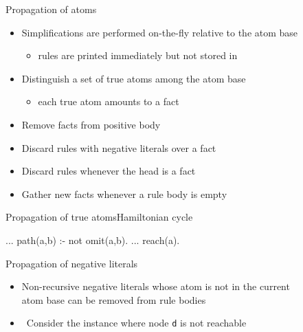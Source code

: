 \begin{frame}{Propagation of atoms}
  \bigskip
  \begin{itemize}
  \item Simplifications are performed \alert{on-the-fly} relative to the atom base
    \begin{itemize}\normalsize
    \item [\itarrow] rules are printed immediately but not stored in \gringo
    \end{itemize}
    \medskip
  \item<2-> Distinguish a set of \alert{true atoms} among the atom base
    \begin{itemize}\normalsize
    \item [\itarrow] each true atom amounts to a fact
    \end{itemize}
    \medskip
  \item<3-> Remove facts from positive body
    \smallskip
  \item<3-> Discard rules with negative literals over a fact
    \smallskip
  \item<3-> Discard rules whenever the head is a fact
    \smallskip
  \item<3-> Gather new facts whenever a rule body is empty
  \end{itemize}
\end{frame}
\begin{frame}[fragile]{Propagation of true atoms}{Hamiltonian cycle}
  \bigskip
  \begin{SemiVerbatim}{.9}
...
path(a,b) :- not omit(a,b).
...
reach(a). {}
\end{SemiVerbatim}
\end{frame}
\begin{frame}{Propagation of negative literals}
  \bigskip
  \begin{itemize}
  \item \alert{Non-recursive negative literals} whose atom is not in the current
    \\ atom base can be removed from rule bodies
    \medskip
  \item {} \ Consider the instance where node \texttt{d} is not reachable
  \end{itemize}
  \bigskip
  \begin{center}
    \Graph[draw=none]
  \end{center}
\end{frame}
